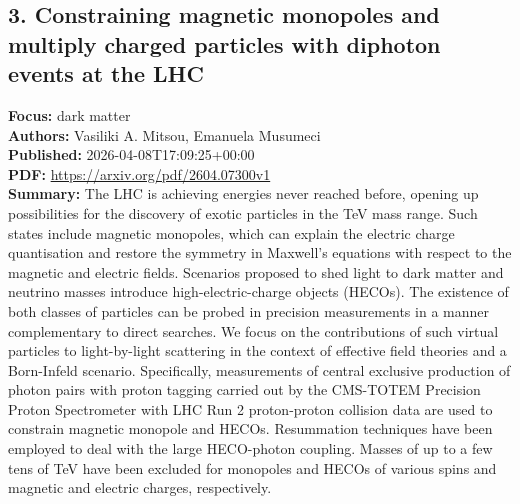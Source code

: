 \documentclass[11pt]{article}
\begin{document}
\subsection*{3. Constraining magnetic monopoles and multiply charged particles with diphoton events at the LHC}
\textbf{Focus:} dark matter\\
\textbf{Authors:} Vasiliki A. Mitsou, Emanuela Musumeci\\
\textbf{Published:} 2026-04-08T17:09:25+00:00\\
\textbf{PDF:} \href{https://arxiv.org/pdf/2604.07300v1}{https://arxiv.org/pdf/2604.07300v1}\\
\textbf{Summary:}
The LHC is achieving energies never reached before, opening up possibilities for the discovery of exotic particles in the TeV mass range. Such states include magnetic monopoles, which can explain the electric charge quantisation and restore the symmetry in Maxwell's equations with respect to the magnetic and electric fields. Scenarios proposed to shed light to dark matter and neutrino masses introduce high-electric-charge objects (HECOs). The existence of both classes of particles can be probed in precision measurements in a manner complementary to direct searches. We focus on the contributions of such virtual particles to light-by-light scattering in the context of effective field theories and a Born-Infeld scenario. Specifically, measurements of central exclusive production of photon pairs with proton tagging carried out by the CMS-TOTEM Precision Proton Spectrometer with LHC Run 2 proton-proton collision data are used to constrain magnetic monopole and HECOs. Resummation techniques have been employed to deal with the large HECO-photon coupling. Masses of up to a few tens of TeV have been excluded for monopoles and HECOs of various spins and magnetic and electric charges, respectively.
\newpage
\end{document}
